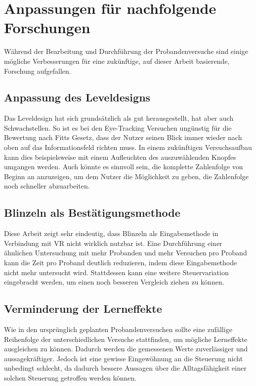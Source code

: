 \section{Anpassungen für nachfolgende Forschungen}
Während der Bearbeitung und Durchführung der Probandenversuche sind einige mögliche Verbesserungen für eine zukünftige, auf dieser Arbeit basierende, Forschung aufgefallen.
\subsection{Anpassung des Leveldesigns}
Das Leveldesign hat sich grundsätzlich als gut herausgestellt, hat aber auch Schwachstellen. So ist es bei den Eye-Tracking Versuchen ungünstig für die Bewertung nach Fitts Gesetz, dass der Nutzer seinen Blick immer wieder nach oben auf das Informationsfeld richten muss. In einem zukünftigen Versuchsaufbau kann dies beispielsweise mit einem Aufleuchten des auszuwählenden Knopfes umgangen werden. Auch könnte es sinnvoll sein, die komplette Zahlenfolge von Beginn an anzuzeigen, um dem Nutzer die Möglichkeit zu geben, die Zahlenfolge noch schneller abzuarbeiten. 
\subsection{Blinzeln als Bestätigungsmethode}
Diese Arbeit zeigt sehr eindeutig, dass Blinzeln als Eingabemethode in Verbindung mit VR nicht wirklich nutzbar ist. Eine Durchführung einer ähnlichen Untersuchung mit mehr Probanden und mehr Versuchen pro Proband kann die Zeit pro Proband deutlich reduzieren, indem diese Eingabemethode nicht mehr untersucht wird. Stattdessen kann eine weitere Steuervariation eingebracht werden, um einen noch besseren Vergleich ziehen zu können. 
\subsection{Verminderung der Lerneffekte}
Wie in den ursprünglich geplanten Probandenversuchen sollte eine zufällige Reihenfolge der unterschiedlichen Versuche stattfinden, um mögliche Lerneffekte ausgleichen zu können. Dadurch werden die gemessenen Werte zuverlässiger und aussagekräftiger. Jedoch ist eine gewisse Eingewöhnung an die Steuerung nicht unbedingt schlecht, da dadurch bessere Aussagen über die Alltagsfähigkeit einer solchen Steuerung getroffen werden können. 


	
